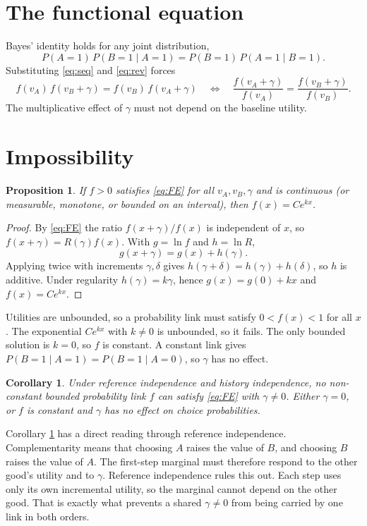 \documentclass[11pt]{article}
\newtheorem{proposition}{Proposition}
\newtheorem{corollary}{Corollary}
\begin{document}
\section{The functional equation}

Bayes' identity holds for any joint distribution,
\[
P(A=1)\,P(B=1\mid A=1)=P(B=1)\,P(A=1\mid B=1).
\]
Substituting \eqref{eq:seq} and \eqref{eq:rev} forces
\begin{equation}\label{eq:FE}
f(v_A)\,f(v_B+\gamma)=f(v_B)\,f(v_A+\gamma)
\quad\Longleftrightarrow\quad
\frac{f(v_A+\gamma)}{f(v_A)}=\frac{f(v_B+\gamma)}{f(v_B)}.
\end{equation}
The multiplicative effect of $\gamma$ must not depend on the baseline
utility.

\section{Impossibility}

\begin{proposition}\label{prop:exp}
If $f>0$ satisfies \eqref{eq:FE} for all $v_A,v_B,\gamma$ and is continuous
(or measurable, monotone, or bounded on an interval), then $f(x)=Ce^{kx}$.
\end{proposition}

\begin{proof}
By \eqref{eq:FE} the ratio $f(x+\gamma)/f(x)$ is independent of $x$, so
$f(x+\gamma)=R(\gamma)f(x)$. With $g=\ln f$ and $h=\ln R$,
\[
g(x+\gamma)=g(x)+h(\gamma).
\]
Applying twice with increments $\gamma,\delta$ gives
$h(\gamma+\delta)=h(\gamma)+h(\delta)$, so $h$ is additive. Under regularity
$h(\gamma)=k\gamma$, hence $g(x)=g(0)+kx$ and $f(x)=Ce^{kx}$.
\end{proof}

Utilities are unbounded, so a probability link must satisfy $0<f(x)<1$ for
all $x$. The exponential $Ce^{kx}$ with $k\neq0$ is unbounded, so it fails.
The only bounded solution is $k=0$, so $f$ is constant. A constant link gives
$P(B=1\mid A=1)=P(B=1\mid A=0)$, so $\gamma$ has no effect.

\begin{corollary}\label{cor:imposs}
Under reference independence and history independence, no non-constant
bounded probability link $f$ can satisfy \eqref{eq:FE} with $\gamma\neq0$.
Either $\gamma=0$, or $f$ is constant and $\gamma$ has no effect on choice
probabilities.
\end{corollary}

Corollary \ref{cor:imposs} has a direct reading through reference
independence. Complementarity means that choosing $A$ raises the value of
$B$, and choosing $B$ raises the value of $A$. The first-step marginal must
therefore respond to the other good's utility and to $\gamma$. Reference
independence rules this out. Each step uses only its own incremental utility,
so the marginal cannot depend on the other good. That is exactly what
prevents a shared $\gamma\neq0$ from being carried by one link in both
orders.
\end{document}
